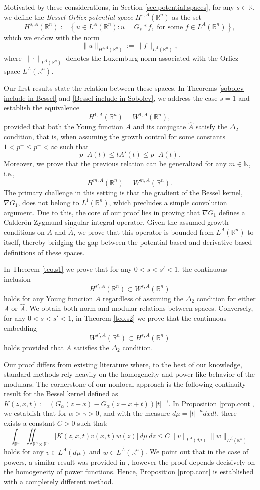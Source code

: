 \documentclass[leqno,twoside, 12pt]{amsart}
\theoremstyle{plain}
\numberwithin{equation}{section} \numberwithin{figure}{section}
\theoremstyle{definition}
\newcommand{\R}{\mathbb R}
\newcommand{\N}{\mathbb N}
\numberwithin{equation}{section}
\begin{document}
Motivated by these considerations, in Section \ref{sec.potential.spaces}, for any $s \in \mathbb{R}$, we define the \emph{Bessel-Orlicz potential space} $H^{s, A}(\mathbb{R}^n)$ as the set
$$
H^{s, A}(\mathbb{R}^n):=\left\lbrace u\in L^A(\mathbb{R}^n): u= G_s*f, \text{ for some }f\in L^A(\mathbb{R}^n)\right\rbrace,
$$
which we endow with the norm
$$
\|u\|_{H^{s, A}(\mathbb{R}^n)}:=\|f\|_{L^A(\mathbb{R}^n)},
$$
where $\|\cdot\|_{L^A(\mathbb{R}^n)}$ denotes the Luxemburg norm associated with the Orlicz space $L^A(\mathbb{R}^n)$.




Our first results state the relation between these spaces. In Theorems \ref{sobolev include in Bessel} and \ref{Bessel include in Sobolev}, we address the case $s=1$ and establish the equivalence 
$$
H^{1,A}(\mathbb{R}^n) = W^{1,A}(\mathbb{R}^n),
$$ 
provided that both the Young function $A$ and its conjugate $\hat{A}$ satisfy the $\Delta_2$ condition, that is, when assuming the growth control for some constants $1<p^-\leq  p^+<\infty$ such that
$$
p^- A(t) \leq tA'(t) \leq p^+ A(t).
$$
Moreover, we prove that the previous relation can be generalized  for any $m\in\N$, i.e., 
$$
H^{m,A}(\mathbb{R}^n) = W^{m,A}(\mathbb{R}^n).
$$ 
The primary challenge in this setting is that the gradient of the Bessel kernel, $\nabla G_1$, does not belong to $L^1(\mathbb{R}^n)$, which precludes a simple convolution argument. Due to this, the core of our proof lies in proving that $\nabla G_1$ defines a Calderón-Zygmund singular integral operator. Given the assumed growth conditions on $A$ and $\hat A$, we prove that this operator is bounded from $L^A(\mathbb{R}^n)$ to itself, thereby bridging the gap between the potential-based and derivative-based definitions of these spaces.

In Theorem \ref{teo.s1} we prove that for any $0<s<s'<1$, the continuous inclusion 
$$
H^{s',A}(\R^n) \subset W^{s,A}(\R^n)
$$ 
holds for any Young function $A$ regardless of assuming the $\Delta_2$ condition for either  $A$ or $\hat A$. We obtain both norm and modular relations between spaces. Conversely, for any $0<s<s'<1$, in Theorem \ref{teo.s2} we prove that the continuous embedding 
$$
W^{s',A}(\R^n)\subset H^{s,A}(\R^n)
$$ 
holds provided that $A$ satisfies the $\Delta_2$ condition.


Our proof differs from existing literature where, to the best of our knowledge, standard methods rely heavily on the homogeneity and power-like behavior of the modulars. The cornerstone of our nonlocal approach is the following continuity result for the Bessel kernel defined as  $K(z,x,t):=(G_\alpha(z-x)-G_\alpha(z-x+t))|t|^{-\gamma}$. In Proposition \ref{prop.cont}, we establish that for $\alpha>\gamma>0$, and with the measure $d\mu=|t|^{-n}dxdt$, there exists a constant $C>0$ such that:
$$
\int_{\R^n} \iint_{\R^n \times \R^n} |K(z,x,t) v(x,t) w(z)|\,d\mu \,dz  \leq C \|v\|_{L^A( d\mu)} \|w\|_{L^{\hat A}(\R^n)}
$$
holds for any $v\in L^A( d\mu)$ and $w\in L^{\hat A}(\R^n)$.  We point out that in the case of powers, a similar result was provided in \cite[Theorem 6.3]{AS}, however the proof depends decisively on the homogeneity of power functions. Hence, Proposition \ref{prop.cont} is established with a completely different method.  
\end{document}
